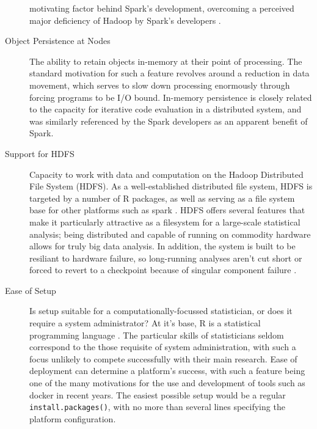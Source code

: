 \documentclass[a4paper,10pt]{article}
\begin{document}
\begin{description}
		motivating factor behind Spark's development, overcoming a
		perceived major deficiency of Hadoop by Spark's developers
		\cite{zaharia2010spark}.
	\item[Object Persistence at Nodes]
	      The ability to retain objects in-memory at their point of
	      processing.
	      The standard motivation for such a feature revolves around a
	      reduction in data movement, which serves to slow down
	      processing enormously through forcing programs to be I/O bound.
	      In-memory persistence is closely related to the capacity for
	      iterative code evaluation in a distributed system, and was
	      similarly referenced by the Spark developers as an
	      apparent benefit of Spark\cite{zaharia2010spark}.
	\item[Support for HDFS]
	      Capacity to work with data and computation on the Hadoop
	      Distributed File System (HDFS).
	      As a well-established distributed file system, HDFS is targeted
	      by a number of R packages, as well as serving as a file
	      system base for other platforms such as spark
	      \cite{analytics:_rhadoop_wiki} \cite{deltarho:_rhipe}
	      \cite{urbanek20} \cite{zaharia2016apache}.
	      HDFS offers several features that make it particularly
	      attractive as a filesystem for a large-scale statistical
	      analysis;
	      being distributed and capable of running on commodity hardware
	      allows for truly big data analysis.
	      In addition, the system is built to be resiliant to hardware
	      failure, so long-running analyses aren't cut short or forced to
	      revert to a checkpoint because of singular component failure
	      \cite{shvachko2010hadoop}.
	\item[Ease of Setup]
	      Is setup suitable for a computationally-focussed
	      statistician, or does it require a system administrator?
	      At it's base, R is a statistical programming language
	      \cite{rcore2020intro}.
	      The particular skills of statisticians seldom correspond to the
	      those requisite of system administration, with such a focus
	      unlikely to compete successfully with their main research.
	      Ease of deployment can determine a platform's success, with
	      such a feature being one of the many motivations for the use
	      and development of tools such as docker in recent years.
	      The easiest possible setup would be a regular
	      \texttt{install.packages()}, with no more than several lines
	      specifying the platform configuration.

\end{description}
\end{document}
